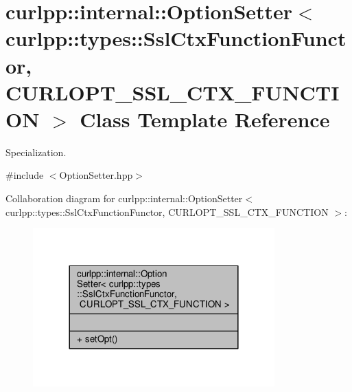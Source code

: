 \hypertarget{classcurlpp_1_1internal_1_1OptionSetter_3_01curlpp_1_1types_1_1SslCtxFunctionFunctor_00_01CURLOPT__SSL__CTX__FUNCTION_01_4}{\section{curlpp\-:\-:internal\-:\-:Option\-Setter$<$ curlpp\-:\-:types\-:\-:Ssl\-Ctx\-Function\-Functor, C\-U\-R\-L\-O\-P\-T\-\_\-\-S\-S\-L\-\_\-\-C\-T\-X\-\_\-\-F\-U\-N\-C\-T\-I\-O\-N $>$ Class Template Reference}
\label{classcurlpp_1_1internal_1_1OptionSetter_3_01curlpp_1_1types_1_1SslCtxFunctionFunctor_00_01CURLOPT__SSL__CTX__FUNCTION_01_4}
}


Specialization.  




{\ttfamily \#include $<$Option\-Setter.\-hpp$>$}



Collaboration diagram for curlpp\-:\-:internal\-:\-:Option\-Setter$<$ curlpp\-:\-:types\-:\-:Ssl\-Ctx\-Function\-Functor, C\-U\-R\-L\-O\-P\-T\-\_\-\-S\-S\-L\-\_\-\-C\-T\-X\-\_\-\-F\-U\-N\-C\-T\-I\-O\-N $>$\-:
\nopagebreak
\begin{figure}[H]
\begin{center}
\leavevmode
\includegraphics[width=264pt]{classcurlpp_1_1internal_1_1OptionSetter_3_01curlpp_1_1types_1_1SslCtxFunctionFunctor_00_01CURLOPe98bfd850c0baf60e8fbb9fe7dad920c}
\end{center}
\end{figure}

